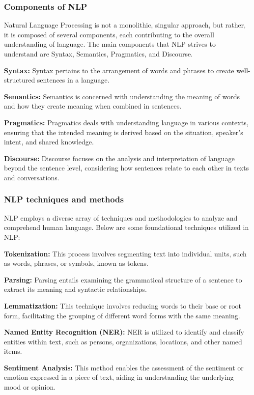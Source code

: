 \subsubsection*{Components of NLP}

Natural Language Processing is not a monolithic, singular approach, but rather, it is composed of several components, each contributing to the overall understanding of language. The main components that NLP strives to understand are Syntax, Semantics, Pragmatics, and Discourse.

\textbf{Syntax:} Syntax pertains to the arrangement of words and phrases to create well-structured sentences in a language.

\textbf{Semantics:} Semantics is concerned with understanding the meaning of words and how they create meaning when combined in sentences.

\textbf{Pragmatics:} Pragmatics deals with understanding language in various contexts, ensuring that the intended meaning is derived based on the situation, speaker's intent, and shared knowledge.

\textbf{Discourse:} Discourse focuses on the analysis and interpretation of language beyond the sentence level, considering how sentences relate to each other in texts and conversations.

\subsubsection*{NLP techniques and methods}

NLP employs a diverse array of techniques and methodologies to analyze and comprehend human language. Below are some foundational techniques utilized in NLP:

\textbf{Tokenization:} This process involves segmenting text into individual units, such as words, phrases, or symbols, known as tokens.

\textbf{Parsing:} Parsing entails examining the grammatical structure of a sentence to extract its meaning and syntactic relationships.

\textbf{Lemmatization:} This technique involves reducing words to their base or root form, facilitating the grouping of different word forms with the same meaning.

\textbf{Named Entity Recognition (NER):} NER is utilized to identify and classify entities within text, such as persons, organizations, locations, and other named items.

\textbf{Sentiment Analysis:} This method enables the assessment of the sentiment or emotion expressed in a piece of text, aiding in understanding the underlying mood or opinion.


